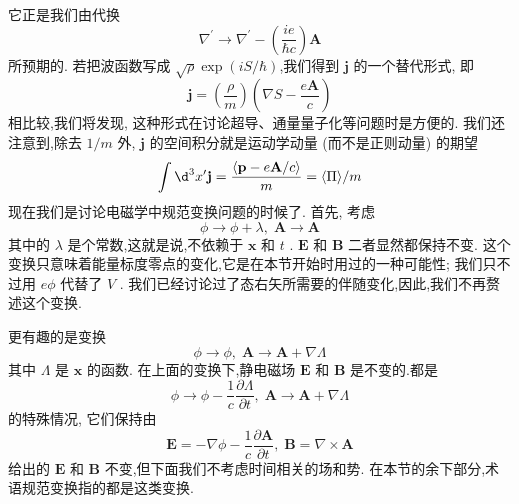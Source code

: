 \documentclass[lang=cn,newtx,10pt,scheme=chinese,thmcnt=section]{elegantbook}
\begin{document}
它正是我们由代换
\begin{equation}
	{\nabla }^{\prime } \rightarrow {\nabla }^{\prime } - \left( \frac{ie}{\hbar c}\right) \mathbf{A}
\end{equation}
所预期的. 若把波函数写成 $\sqrt{\rho }\exp \left( {{iS}/\hbar }\right)$,我们得到 $\mathbf{j}$ 的一个替代形式, 即
\begin{equation}
	\mathbf{j} = \left( \frac{\rho }{m}\right) \left( {\nabla S - \frac{e\mathbf{A}}{c}}\right)
\end{equation}
相比较,我们将发现, 这种形式在讨论超导、通量量子化等问题时是方便的. 我们还注意到,除去 $1/m$ 外, $\mathbf{j}$ 的空间积分就是运动学动量 (而不是正则动量) 的期望
\begin{equation}
	\int {\d}^{3}{x}^{\prime }\mathbf{j} = \frac{\langle \mathbf{p} - e\mathbf{A}/c\rangle }{m} = \langle \Pi \rangle /m
\end{equation}
现在我们是讨论电磁学中规范变换问题的时候了. 首先, 考虑
\begin{equation}
	\phi \rightarrow \phi + \lambda ,\;\mathbf{A} \rightarrow \mathbf{A}
\end{equation}
其中的 $\lambda$ 是个常数,这就是说,不依赖于 $\mathbf{x}$ 和 $t$ . $\mathbf{E}$ 和 $\mathbf{B}$ 二者显然都保持不变. 这个变换只意味着能量标度零点的变化,它是在本节开始时用过的一种可能性; 我们只不过用 ${e\phi }$ 代替了 $V$ . 我们已经讨论过了态右矢所需要的伴随变化,因此,我们不再赘述这个变换.

更有趣的是变换
\begin{equation}
	\phi \rightarrow \phi ,\;\mathbf{A} \rightarrow \mathbf{A} + \nabla \Lambda
\end{equation}
其中 $\Lambda$ 是 $\mathbf{x}$ 的函数. 在上面的变换下,静电磁场 $\mathbf{E}$ 和 $\mathbf{B}$ 是不变的.都是
\begin{equation}
	\phi \rightarrow \phi - \frac{1}{c}\frac{\partial \Lambda }{\partial t},\;\mathbf{A} \rightarrow \mathbf{A} + \nabla \Lambda
\end{equation}
的特殊情况, 它们保持由
\begin{equation}
	\mathbf{E} = - \nabla \phi - \frac{1}{c}\frac{\partial \mathbf{A}}{\partial t},\;\mathbf{B} = \nabla \times \mathbf{A}
\end{equation}
给出的 $\mathbf{E}$ 和 $\mathbf{B}$ 不变,但下面我们不考虑时间相关的场和势. 在本节的余下部分,术语规范变换指的都是这类变换.
\end{document}
